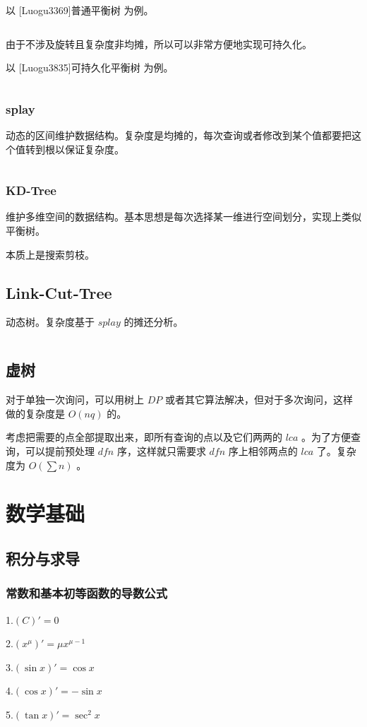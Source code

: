 \documentclass[UTF-8]{ctexart}
\newcommand{\cpp}[1]{\inputminted[bgcolor=bg,breaklines,breakanywhere=true]{c++}{#1}}
\begin{document}
			以 [Luogu3369]普通平衡树 为例。
			\cpp{code/Example/Luogu3369.cpp}
	
			由于不涉及旋转且复杂度非均摊，所以可以非常方便地实现可持久化。
			
			以 [Luogu3835]可持久化平衡树 为例。
			\cpp{code/Example/Luogu3835.cpp}
			\subsubsection{splay}
			动态的区间维护数据结构。复杂度是均摊的，每次查询或者修改到某个值都要把这个值转到根以保证复杂度。
			\cpp{code//DataStruct//splay.cpp}
			\subsubsection{KD-Tree}
			维护多维空间的数据结构。基本思想是每次选择某一维进行空间划分，实现上类似平衡树。
	
			本质上是搜索剪枝。
			\subsection{Link-Cut-Tree}
			动态树。复杂度基于 $splay$ 的摊还分析。
			\cpp{code//DataStruct//lct.cpp}
		\subsection{虚树}
		对于单独一次询问，可以用树上 $DP$ 或者其它算法解决，但对于多次询问，这样做的复杂度是 $O(nq)$ 的。
	
		考虑把需要的点全部提取出来，即所有查询的点以及它们两两的 $lca$ 。为了方便查询，可以提前预处理 $dfn$ 序，这样就只需要求 $dfn$ 序上相邻两点的 $lca$ 了。复杂度为 $O(\sum n)$ 。
\section{数学基础}
	\subsection{积分与求导}
	\subsubsection{常数和基本初等函数的导数公式}
	1.$(C)'=0$  
	
	2.$(x^\mu)'=\mu x^{\mu-1}$  
	
	3.$(\sin x)'=\cos x$  
	
	4.$(\cos x)'=-\sin x$  
	
	5.$(\tan x)'=\sec^2 x$  
	
\end{document}
